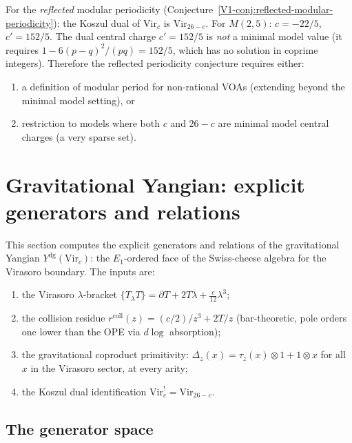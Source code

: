 \documentclass[11pt]{article}
\begin{document}
\begin{remark}
For the \emph{reflected} modular periodicity
(Conjecture~\ref*{V1-conj:reflected-modular-periodicity}):
the Koszul dual of $\mathrm{Vir}_c$ is $\mathrm{Vir}_{26-c}$.
For $M(2,5)$: $c = -22/5$, $c' = 152/5$.
The dual central charge $c' = 152/5$ is \emph{not} a minimal
model value (it requires $1 - 6(p-q)^2/(pq) = 152/5$, which
has no solution in coprime integers).  Therefore the reflected
periodicity conjecture requires either:
\begin{enumerate}[nosep]
\item a definition of modular period for non-rational VOAs
  (extending beyond the minimal model setting), or
\item restriction to models where both $c$ and $26-c$ are
  minimal model central charges (a very sparse set).
\end{enumerate}
\end{remark}


\section{Gravitational Yangian: explicit generators and relations}
\label{sec:gravitational-yangian-explicit}

This section computes the explicit generators and relations of the
gravitational Yangian $Y^{\mathrm{dg}}(\mathrm{Vir}_c)$: the
$E_1$-ordered face of the Swiss-cheese algebra for the Virasoro
boundary.  The inputs are:
\begin{enumerate}[label=(\arabic*)]
\item the Virasoro $\lambda$-bracket
  $\{T{}_\lambda T\} = \partial T + 2T\lambda + \frac{c}{12}\lambda^3$;
\item the collision residue
  $r^{\mathrm{coll}}(z) = (c/2)/z^3 + 2T/z$
  (bar-theoretic, pole orders one lower than the OPE via $d\log$
  absorption);
\item the gravitational coproduct primitivity:
  $\Delta_z(x) = \tau_z(x) \otimes 1 + 1 \otimes x$
  for all $x$ in the Virasoro sector, at every arity;
\item the Koszul dual identification
  $\mathrm{Vir}_c^! = \mathrm{Vir}_{26-c}$.
\end{enumerate}

\subsection{The generator space}
\end{document}
